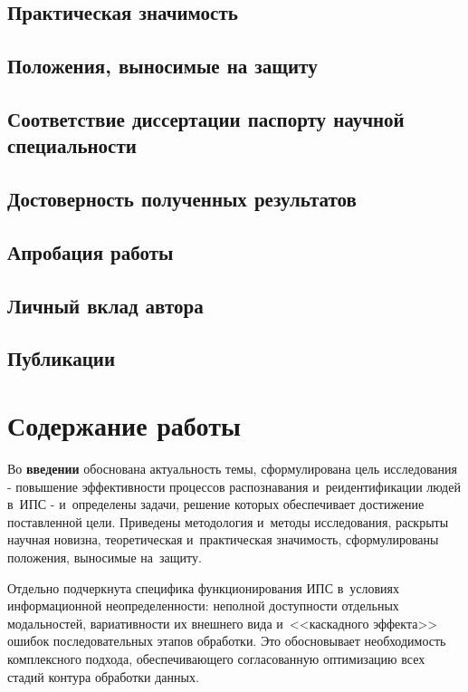\subsection*{Практическая значимость}
\influenceText

\subsection*{Положения, выносимые на защиту}

\subsection*{Соответствие диссертации паспорту научной специальности}
\conformityText

\subsection*{Достоверность полученных результатов}
\reliabilityText

\subsection*{Апробация работы}
\probationText

\subsection*{Личный вклад автора}
\contributionText

\subsection*{Публикации}
\publicationsText

\section*{Содержание работы}

Во \textbf{введении} обоснована актуальность темы, сформулирована цель
исследования - повышение эффективности процессов распознавания
и~реидентификации людей в~ИПС - и~определены задачи, решение которых
обеспечивает достижение поставленной цели. Приведены методология и~методы исследования, раскрыты научная
новизна, теоретическая и~практическая значимость, сформулированы положения,
выносимые на~защиту.

Отдельно подчеркнута специфика функционирования ИПС в~условиях
информационной неопределенности: неполной доступности отдельных модальностей,
вариативности их внешнего вида и~<<каскадного эффекта>> ошибок
последовательных этапов обработки. Это обосновывает
необходимость комплексного подхода, обеспечивающего согласованную
оптимизацию всех стадий контура обработки данных.

